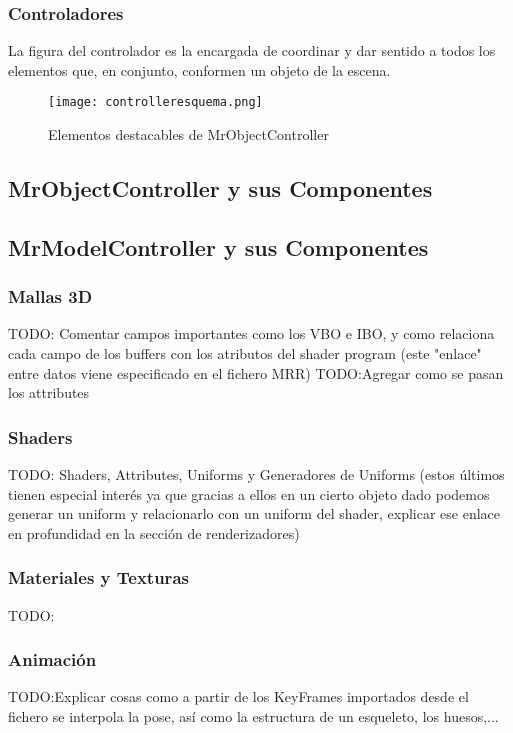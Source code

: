 \subsubsection{Controladores}
La figura del controlador es la encargada de coordinar y dar sentido a todos los elementos que, en conjunto, conformen un objeto de la escena. 

\begin{figure}[h!]
\begin{center}
\texttt{[image: controlleresquema.png]}
\end{center}
\caption[Elementos destacables de MrObjectController]{Elementos destacables de MrObjectController}
\label{fig:controlleresquema}
\end{figure}

\subsection{MrObjectController y sus Componentes}

\subsection{MrModelController y sus Componentes}
\subsubsection{Mallas 3D}
TODO: Comentar campos importantes como los VBO e IBO, y como relaciona cada campo de los buffers con los atributos del shader program (este "enlace" entre datos viene especificado en el fichero MRR)
TODO:Agregar como se pasan los attributes\\
\subsubsection{Shaders}
TODO: Shaders, Attributes, Uniforms y Generadores de Uniforms (estos últimos tienen especial interés ya que gracias a ellos en un cierto objeto dado podemos generar un uniform y relacionarlo con un uniform del shader, explicar ese enlace en profundidad en la sección de renderizadores)
\subsubsection{Materiales y Texturas}
TODO:
\subsubsection{Animación}
TODO:Explicar cosas como a partir de los KeyFrames importados desde el fichero se interpola la pose, así como la estructura de un esqueleto, los huesos,...



